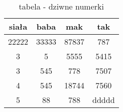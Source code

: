 \begin{table}[htbp]
\centering
\begin{tabular}{||c c c c||} 
 \hline
 siała & baba & mak & tak \\ [0.5ex] 
 \hline\hline
 22222 & 33333 & 87837 & 787 \\ 
 \hline
 3 & 5 & 5555 & 5415 \\
 \hline
 3 & 545 & 778 & 7507 \\
 \hline
 4 & 545 & 18744 & 7560 \\
 \hline
 5 & 88 & 788 & ddddd \\
 \hline
\end{tabular}
\label{tab:tab1}
\caption{tabela - dziwne numerki}
\end{table}